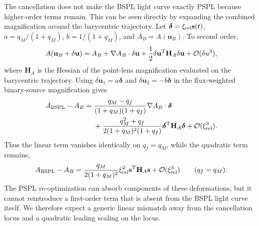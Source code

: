\documentclass{article}
\begin{document}
The cancellation does not make the BSPL light curve exactly PSPL because
higher-order terms remain. This can be seen directly by expanding the
combined magnification around the barycentric trajectory. Let
$\boldsymbol{\delta}=\xi_{\rm rel}\mathbf{s}(t)$,
$a=q_M/(1+q_M)$, $b=1/(1+q_M)$, and
$A_B=A(\mathbf{u}_B)$. To second order,
\begin{equation}
A(\mathbf{u}_B+\delta\mathbf{u})
=
A_B
+
\nabla A_B\cdot\delta\mathbf{u}
+
\frac{1}{2}
\delta\mathbf{u}^{\rm T}\mathbf{H}_A\delta\mathbf{u}
+
\mathcal{O}(\delta u^3),
\label{eq:taylor_A}
\end{equation}
where $\mathbf{H}_A$ is the Hessian of the point-lens magnification
evaluated on the barycentric trajectory. Using
$\delta\mathbf{u}_1=a\boldsymbol{\delta}$ and
$\delta\mathbf{u}_2=-b\boldsymbol{\delta}$ in the flux-weighted
binary-source magnification gives
\begin{align}
A_{\rm BSPL}-A_B
={}&
\frac{q_M-q_f}{(1+q_M)(1+q_f)}
\nabla A_B\cdot\boldsymbol{\delta}
\nonumber\\
&+
\frac{q_M^2+q_f}
{2(1+q_M)^2(1+q_f)}
\boldsymbol{\delta}^{\rm T}\mathbf{H}_A\boldsymbol{\delta}
+
\mathcal{O}(\xi_{\rm rel}^3).
\label{eq:photocenter_taylor}
\end{align}
Thus the linear term vanishes identically on $q_f=q_M$, while the
quadratic term remains,
\begin{equation}
A_{\rm BSPL}-A_B
=
\frac{q_M}{2(1+q_M)^2}
\xi_{\rm rel}^{2}
\mathbf{s}^{\rm T}\mathbf{H}_A\mathbf{s}
+
\mathcal{O}(\xi_{\rm rel}^{3})
\qquad(q_f=q_M).
\label{eq:photocenter_quadratic}
\end{equation}
The PSPL re-optimization can absorb components of these deformations,
but it cannot reintroduce a first-order term that is absent from the
BSPL light curve itself. We therefore expect a generic linear mismatch
away from the cancellation locus and a quadratic leading scaling on the
locus.
\end{document}

